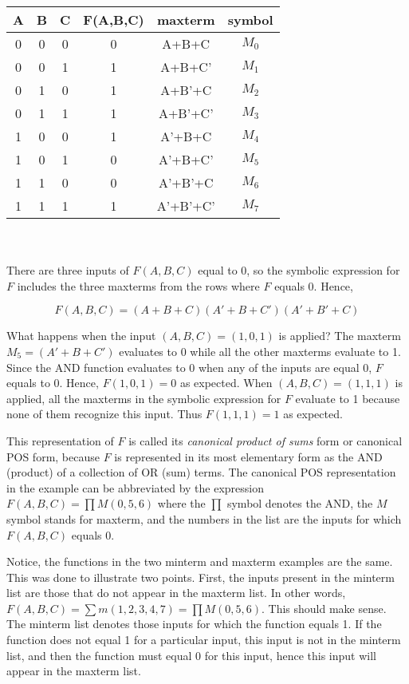 \begin{tabular}{c|c|c||c|c|c}
A & B & C & F(A,B,C) & maxterm   & symbol \\ \hline
0 & 0 & 0 & 0        & A+B+C     & $M_0$   \\ \hline
0 & 0 & 1 & 1        & A+B+C'    & $M_1$   \\ \hline
0 & 1 & 0 & 1        & A+B'+C    & $M_2$   \\ \hline
0 & 1 & 1 & 1        & A+B'+C'   & $M_3$   \\ \hline
1 & 0 & 0 & 1        & A'+B+C    & $M_4$   \\ \hline
1 & 0 & 1 & 0        & A'+B+C'   & $M_5$   \\ \hline
1 & 1 & 0 & 0        & A'+B'+C   & $M_6$   \\ \hline
1 & 1 & 1 & 1        & A'+B'+C'  & $M_7$   \\ 
\end{tabular}
\\ \\
There are three inputs of $F(A,B,C)$ equal to 0, so the symbolic
expression for $F$ includes the three maxterms from the rows where
$F$ equals 0.  Hence, 

$$F(A,B,C) =  (A+B+C)(A'+B+C')(A'+B'+C)$$

What happens when the input $(A,B,C)=(1,0,1)$ is applied?  
The maxterm $M_5=(A'+B+C')$ evaluates to 0 while all the other maxterms 
evaluate to 1.  Since the AND function evaluates to 0 when any of 
the inputs are equal 0, $F$ equals to 0. Hence, $F(1,0,1)=0$ as
expected.  When $(A,B,C)=(1,1,1)$ is applied, all the
maxterms in the symbolic expression for $F$ evaluate to 1 because
none of them recognize this input.  Thus $F(1,1,1)=1$ as expected.

This representation of $F$ is called its \textit{canonical product of sums} 
form or canonical POS form, because $F$ is represented in its most
elementary form as the AND (product) of a collection of OR (sum) terms.  
The canonical POS representation in the example can be abbreviated by 
the expression $F(A,B,C) = \prod M(0,5,6)$  where the $\prod$
symbol denotes the AND, the $M$ symbol stands for maxterm, and the 
numbers in the list are the inputs for which $F(A,B,C)$ equals 0.

Notice, the functions in the two minterm and maxterm examples are the 
same.  This was done to illustrate two points.  First, the inputs 
present in the minterm list are those that do not appear in the maxterm 
list.  In other words, $F(A,B,C) = \sum m(1,2,3,4,7) = \prod M (0,5,6)$.  
This should make sense. The minterm list denotes those inputs for 
which the function equals 1.  If the function does not equal 1 for 
a particular input, this input is not in the minterm list, and then the 
function must equal 0 for this input, hence this input will appear 
in the maxterm list.

